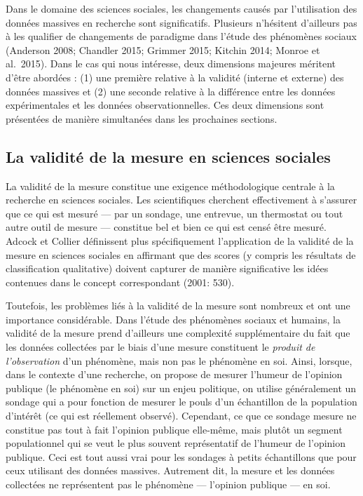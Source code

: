 \documentclass[
  letterpaper,
  DIV=11,
  numbers=noendperiod]{scrreprt}
\begin{document}

Dans le domaine des sciences sociales, les changements causés par
l'utilisation des données massives en recherche sont significatifs.
Plusieurs n'hésitent d'ailleurs pas à les qualifier de changements de
paradigme dans l'étude des phénomènes sociaux (Anderson 2008; Chandler
2015; Grimmer 2015; Kitchin 2014; Monroe et al.~2015). Dans le cas qui
nous intéresse, deux dimensions majeures méritent d'être abordées : (1)
une première relative à la validité (interne et externe) des données
massives et (2) une seconde relative à la différence entre les données
expérimentales et les données observationnelles. Ces deux dimensions
sont présentées de manière simultanées dans les prochaines sections.

\hypertarget{la-validituxe9-de-la-mesure-en-sciences-sociales}{%
\subsection*{La validité de la mesure en sciences
sociales}\label{la-validituxe9-de-la-mesure-en-sciences-sociales}}

La validité de la mesure constitue une exigence méthodologique centrale
à la recherche en sciences sociales. Les scientifiques cherchent
effectivement à s'assurer que ce qui est mesuré --- par un sondage, une
entrevue, un thermostat ou tout autre outil de mesure --- constitue bel
et bien ce qui est censé être mesuré. Adcock et Collier définissent plus
spécifiquement l'application de la validité de la mesure en sciences
sociales en affirmant que des scores (y compris les résultats de
classification qualitative) doivent capturer de manière significative
les idées contenues dans le concept correspondant (2001: 530).

Toutefois, les problèmes liés à la validité de la mesure sont nombreux
et ont une importance considérable. Dans l'étude des phénomènes sociaux
et humains, la validité de la mesure prend d'ailleurs une complexité
supplémentaire du fait que les données collectées par le biais d'une
mesure constituent le \emph{produit de l'observation} d'un phénomène,
mais non pas le phénomène en soi. Ainsi, lorsque, dans le contexte d'une
recherche, on propose de mesurer l'humeur de l'opinion publique (le
phénomène en soi) sur un enjeu politique, on utilise généralement un
sondage qui a pour fonction de mesurer le pouls d'un échantillon de la
population d'intérêt (ce qui est réellement observé). Cependant, ce que
ce sondage mesure ne constitue pas tout à fait l'opinion publique
elle-même, mais plutôt un segment populationnel qui se veut le plus
souvent représentatif de l'humeur de l'opinion publique. Ceci est tout
aussi vrai pour les sondages à petits échantillons que pour ceux
utilisant des données massives. Autrement dit, la mesure et les données
collectées ne représentent pas le phénomène --- l'opinion publique ---
en soi.
\end{document}
